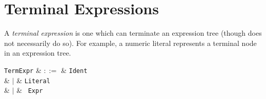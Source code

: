 \section{Terminal Expressions}
\label{c_expr_term}

A {\em terminal expression} is one which can terminate an expression tree (though does not necessarily do so).  For example, a numeric literal represents a terminal node in an expression tree.

\begin{syntax}
  \verb+TermExpr+ & $::=$ & \verb+Ident+\\
  & $|$ & \verb+Literal+\\
  & $|$ & \token{(}\ \verb+Expr+\ \token{)}\\
\end{syntax}

